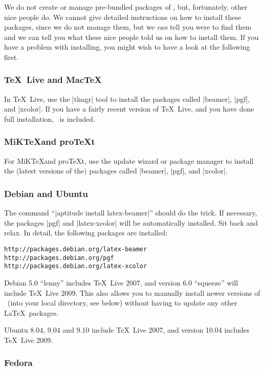 We do not create or manage pre-bundled packages of \beamer, but, fortunately, other nice people do. We cannot give detailed instructions on how to install these packages, since we do not manage them, but we \emph{can} tell you were to find them and we can tell you what these nice people told us on how to install them. If you have a problem with installing, you might wish to have a look at the following first.


\subsubsection{\TeX\ Live and Mac\TeX}

In \TeX\ Live, use the |tlmgr| tool to install the packages called |beamer|, |pgf|, and |xcolor|. If you have a fairly recent version of \TeX\ Live, and you have done full installation, \beamer\ is included.

\subsubsection{MiK\TeX and pro\TeX t}

For MiK\TeX and pro\TeX t, use the update wizard or package manager to install the (latest versions of the) packages called |beamer|, |pgf|, and |xcolor|.

\subsubsection{Debian and Ubuntu}

The command ``|aptitude install latex-beamer|'' should do the trick. If necessary, the packages |pgf| and |latex-xcolor| will be automatically installed. Sit back and relax. In detail, the following packages are installed:
\begin{verbatim}
http://packages.debian.org/latex-beamer
http://packages.debian.org/pgf
http://packages.debian.org/latex-xcolor
\end{verbatim}

Debian 5.0 ``lenny'' includes \TeX\ Live 2007, and version 6.0 ``squeeze'' will include \TeX\ Live 2009. This also allows you to manually install newer versions of \beamer\ (into your local directory, see below) without having to update any other \LaTeX\ packages.

Ubuntu 8.04, 9.04 and 9.10 include \TeX\ Live 2007, and version 10.04 includes \TeX\ Live 2009.

\subsubsection{Fedora}

